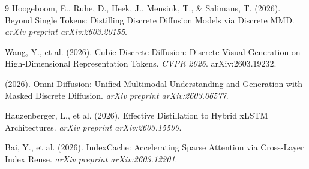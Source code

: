 \documentclass[11pt]{article}
\begin{document}
\begin{thebibliography}{9}
 Hoogeboom, E., Ruhe, D., Heek, J., Mensink, T., \& Salimans, T. (2026). Beyond Single Tokens: Distilling Discrete Diffusion Models via Discrete MMD. \textit{arXiv preprint arXiv:2603.20155}.

 Wang, Y., et al. (2026). Cubic Discrete Diffusion: Discrete Visual Generation on High-Dimensional Representation Tokens. \textit{CVPR 2026}. arXiv:2603.19232.

 (2026). Omni-Diffusion: Unified Multimodal Understanding and Generation with Masked Discrete Diffusion. \textit{arXiv preprint arXiv:2603.06577}.

 Hauzenberger, L., et al. (2026). Effective Distillation to Hybrid xLSTM Architectures. \textit{arXiv preprint arXiv:2603.15590}.

 Bai, Y., et al. (2026). IndexCache: Accelerating Sparse Attention via Cross-Layer Index Reuse. \textit{arXiv preprint arXiv:2603.12201}.
\end{thebibliography}
\end{document}
